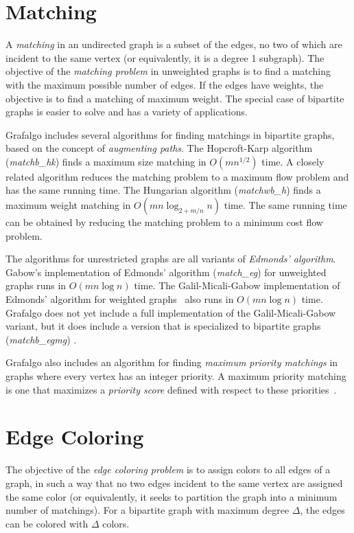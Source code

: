 \documentclass[11pt]{article}
\begin{document}
\section{Matching}

A {\sl matching} in an undirected graph is a subset of the edges,
no two of which are incident to the same vertex (or equivalently, it is a degree 1 subgraph).
The objective of the {\sl matching problem} in unweighted graphs is to find a matching
with the maximum possible number of edges.
If the edges have weights, the objective is to find a matching of maximum weight.
The special case of bipartite graphs is easier to solve and has a variety of applications.

Grafalgo includes several algorithms for finding matchings in bipartite graphs,
based on the concept of {\sl augmenting paths}.
The Hopcroft-Karp algorithm ({\sl matchb\_hk}) finds a maximum size matching in $O(m n^{1/2})$ time.
A closely related algorithm reduces the matching problem to a maximum flow problem and
has the same running time.
The Hungarian algorithm ({\sl matchwb\_h}) finds a maximum weight matching in $O(mn\log_{2+m/n} n)$ time.
The same running time can be obtained by reducing the matching problem to a minimum cost flow problem.

The algorithms for unrestricted graphs are all variants of {\sl Edmonds' algorithm}.
Gabow's implementation of Edmonds' algorithm ({\sl match\_eg}) for unweighted graphs runs in $O(mn \log n)$ time.
The Galil-Micali-Gabow implementation of Edmonds' algorithm for weighted
graphs~\cite{GMG86} also runs in $O(mn \log n)$ time.
Grafalgo does not yet include a full implementation of the Galil-Micali-Gabow variant,
but it does include a version that is specialized to bipartite graphs ({\sl matchb\_egmg}) .

Grafalgo also includes an algorithm for finding {\sl maximum priority matchings} in graphs where every vertex
has an integer priority. A maximum priority matching is one that maximizes a {\sl priority score}
defined with respect to these priorities~\cite{turner-2015b, turner-2015d}.

\section{Edge Coloring}

The objective of the {\sl edge coloring problem} is to assign colors to all edges of a graph,
in such a way that no two edges incident to the same vertex are assigned the same color
(or equivalently, it seeks to partition the graph into a minimum number of matchings).
For a bipartite graph with maximum degree $\Delta$, the edges can be colored with $\Delta$ colors.
\end{document}
